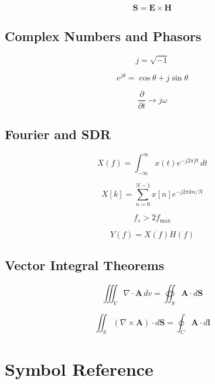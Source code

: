 \documentclass[11pt]{article}
\newcommand{\vect}[1]{\mathbf{#1}}
\begin{document}
\[
\boxed{
\vect{S}
=
\vect{E}\times\vect{H}
}
\]

\subsection*{Complex Numbers and Phasors}

\[
\boxed{
j=\sqrt{-1}
}
\]

\[
\boxed{
e^{j\theta}
=
\cos\theta+j\sin\theta
}
\]

\[
\boxed{
\frac{\partial}{\partial t}
\longrightarrow
j\omega
}
\]

\subsection*{Fourier and SDR}

\[
\boxed{
X(f)
=
\int_{-\infty}^{\infty}
x(t)e^{-j2\pi ft}\,dt
}
\]

\[
\boxed{
X[k]
=
\sum_{n=0}^{N-1}
x[n]e^{-j2\pi kn/N}
}
\]

\[
\boxed{
f_s>2f_{\max}
}
\]

\[
\boxed{
Y(f)
=
X(f)H(f)
}
\]

\subsection*{Vector Integral Theorems}

\[
\boxed{
\iiint_V
\nabla\cdot\vect{A}\,dv
=
\oiint_S
\vect{A}\cdot d\vect{S}
}
\]

\[
\boxed{
\iint_S
(\nabla\times\vect{A})
\cdot d\vect{S}
=
\oint_C
\vect{A}\cdot d\vect{l}
}
\]



\section{Symbol Reference}
\end{document}
